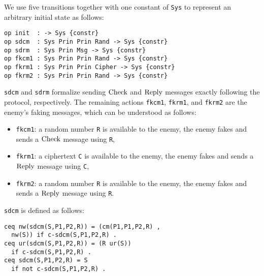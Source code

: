 \documentclass[10pt, conference, compsocconf]{IEEEtran}
\begin{document}
We use five transitions together with one constant of \verb!Sys! to represent an arbitrary initial state as follows:

\begin{small}
	\begin{verbatim}
op init  : -> Sys {constr}
op sdcm  : Sys Prin Prin Rand -> Sys {constr}
op sdrm  : Sys Prin Msg -> Sys {constr}
op fkcm1 : Sys Prin Prin Rand -> Sys {constr}
op fkrm1 : Sys Prin Prin Cipher -> Sys {constr}
op fkrm2 : Sys Prin Prin Rand -> Sys {constr}
	\end{verbatim}
\end{small}

\noindent
\verb!sdcm! and \verb!sdrm! formalize sending $\rm Check$ and $\rm Reply$ messages exactly following the protocol, respectively.
The remaining actions \verb!fkcm1!, \verb!fkrm1!, and \verb!fkrm2! are the enemy's faking messages, which can be understood as follows:
\begin{itemize}
	\item \verb!fkcm1!: a random number \verb!R! is available to the enemy, the enemy fakes and sends a $\rm Check$ message using \verb!R!, 
	\item \verb!fkrm1!: a ciphertext \verb!C! is available to the enemy, the enemy fakes and sends a $\rm Reply$ message using \verb!C!, 
	\item \verb!fkrm2!: a random number \verb!R! is available to the enemy, the enemy fakes and sends a $\rm Reply$ message using \verb!R!.
\end{itemize}

\verb!sdcm! is defined as follows:
\begin{small}
	\begin{verbatim}
ceq nw(sdcm(S,P1,P2,R)) = (cm(P1,P1,P2,R) ,
  nw(S)) if c-sdcm(S,P1,P2,R) .
ceq ur(sdcm(S,P1,P2,R)) = (R ur(S))
  if c-sdcm(S,P1,P2,R) .
ceq sdcm(S,P1,P2,R) = S 
  if not c-sdcm(S,P1,P2,R) .
	\end{verbatim}
\end{small}
\end{document}
